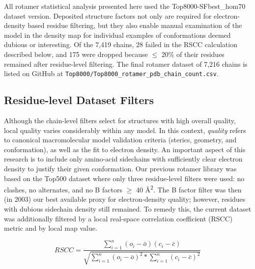 All rotamer statistical analysis presented here used the Top8000-SFbest\_hom70 dataset version. Deposited structure factors not only are required for electron-density based residue filtering, but they also enable manual examination of the model in the density map for individual examples of conformations deemed dubious or interesting. Of the 7,419 chains, 28 failed in the RSCC calculation described below, and 175 were dropped because $\le$ 20\% of their residues remained after residue-level filtering. The final rotamer dataset of 7,216 chains is listed on GitHub at \texttt{Top8000/Top8000\_rotamer\_pdb\_chain\_count.csv}.


\subsection{Residue-level Dataset Filters}
\label{sec:resfilters}
Although the chain-level filters select for structures with high overall quality, local quality varies considerably within any model. In this context, \emph{quality} refers to canonical macromolecular model validation criteria (sterics, geometry, and conformation), as well as the fit to electron density. An important aspect of this research is to include only amino-acid sidechains with sufficiently clear electron density to justify their given conformation. Our previous rotamer library was based on the Top500 dataset where only three residue-level filters were used: no clashes, no alternates, and no B factors $\ge$ 40 \AA\textsuperscript{2}. The B factor filter was then (in 2003) our best available proxy for electron-density quality; however, residues with dubious sidechain density still remained. To remedy this, the current dataset was additionally filtered by a local real-space correlation coefficient (RSCC) metric \textcolor{changecolor}{\cite{Kleywegt:ba5061}} and by local map value.

\begin{equation}
RSCC = \frac{\sum_{i=1}^{n} \left ( o_{i} - \bar{o} \right )\left ( c_{i} - \bar{c} \right )}{\sqrt{\sum_{i=1}^{n} \left ( o_{i} - \bar{o} \right )^{2} \ast \sum_{i=1}^{n}\left ( c_{i} - \bar{c} \right )^{2}}}
\label{rscceq}
\end{equation}


